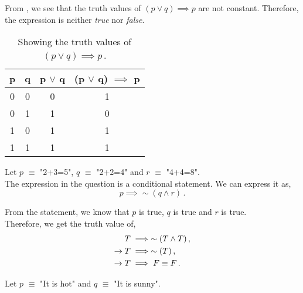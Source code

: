 \begin{subquestions}
\begin{subsubquestions}
From , we see that the truth values of $(p \lor q) \implies p$ are not constant. Therefore, the expression is neither \textit{true} nor \textit{false}.
\begin{table}[ht]
	\centering
	\begin{tabular}{|c|c|c|c|}
		\hline
		p & q & p $\lor$ q & (p $\lor$ q) $\implies$ p \\
		\hline
		0 & 0 & 0 & 1 \\
		0 & 1 & 1 & 0 \\
		1 & 0 & 1 & 1 \\
		1 & 1 & 1 & 1 \\
		\hline
	\end{tabular}
	\caption{\label{2012:q2:TruthTab2} Showing the truth values of $(p \lor q) \implies p$\,.}
\end{table}
\end{subsubquestions}


\subquestion

Let $p$ $\equiv$ "2+3=5", $q$ $\equiv$ "2+2=4" and $r$ $\equiv$ "4+4=8". \\	
The expression in the question is a conditional statement. We can express it as, 
\begin{equation}
	p \implies \sim (q \land r)\,.
\end{equation}

From the statement, we know that $p$ is true, $q$ is true and $r$ is true. \\
Therefore, we get the truth value of,
\begin{align}
	T & \implies \sim(T \land T)\,, \nonumber \\
	\rightarrow T & \implies \sim(T)\,, \nonumber \\
	\rightarrow T & \implies F \equiv F\,.
\end{align}


\subquestion

\begin{subsubquestions}
	
\subsubquestion
Let $p$ $\equiv$ "It is hot" and $q$ $\equiv$ "It is sunny". \\


\end{subsubquestions}
\end{subquestions}
